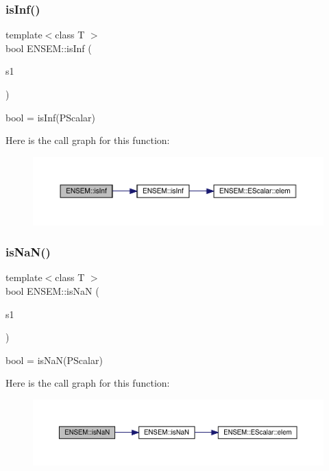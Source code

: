 \subsubsection{\texorpdfstring{isInf()}{isInf()}}
{\footnotesize\ttfamily template$<$class T $>$ \\
bool E\+N\+S\+E\+M\+::is\+Inf (\begin{DoxyParamCaption}\item[{const \mbox{\hyperlink{classENSEM_1_1PScalar}{P\+Scalar}}$<$ T $>$ \&}]{s1 }\end{DoxyParamCaption})}



bool = is\+Inf(\+P\+Scalar) 

Here is the call graph for this function\+:\nopagebreak
\begin{figure}[H]
\begin{center}
\leavevmode
\includegraphics[width=350pt]{db/dcc/group__primscalar_gadaa3bcd952c27bc79132fc1037584dcc_cgraph}
\end{center}
\end{figure}
\mbox{\label{group__primscalar_ga45c19c10ac52adfa3deff1ead05f3dbc}} 
\subsubsection{\texorpdfstring{isNaN()}{isNaN()}}
{\footnotesize\ttfamily template$<$class T $>$ \\
bool E\+N\+S\+E\+M\+::is\+NaN (\begin{DoxyParamCaption}\item[{const \mbox{\hyperlink{classENSEM_1_1PScalar}{P\+Scalar}}$<$ T $>$ \&}]{s1 }\end{DoxyParamCaption})}



bool = is\+Na\+N(\+P\+Scalar) 

Here is the call graph for this function\+:\nopagebreak
\begin{figure}[H]
\begin{center}
\leavevmode
\includegraphics[width=350pt]{db/dcc/group__primscalar_ga45c19c10ac52adfa3deff1ead05f3dbc_cgraph}
\end{center}
\end{figure}
\mbox{\label{group__primscalar_gab10f703e7498f1638c401a92ca8bc947}} 
